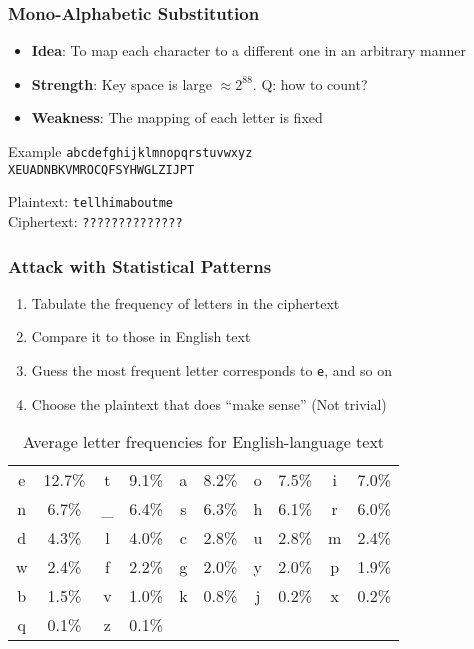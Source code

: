 \begin{frame}[fragile]\frametitle{Mono-Alphabetic Substitution}
\begin{itemize}
\item \textbf{Idea}: To map each character to a different one in an arbitrary manner
\item \textbf{Strength}: Key space is large $\approx 2^{88}$. \alert{Q: how to count?}
\item \textbf{Weakness}: The mapping of each letter is fixed
\end{itemize}
\begin{exampleblock}{Example}
\verb|abcdefghijklmnopqrstuvwxyz|\\
\verb|XEUADNBKVMROCQFSYHWGLZIJPT|

Plaintext: \verb|tellhimaboutme|\\
Ciphertext: \verb|??????????????|
\end{exampleblock}
\end{frame}
\begin{frame}[fragile]\frametitle{Attack with Statistical Patterns}
\begin{enumerate}
\item Tabulate the frequency of letters in the ciphertext
\item Compare it to those in English text
\item Guess the most frequent letter corresponds to \verb|e|, and so on
\item Choose the plaintext that does ``make sense'' (Not trivial)
\end{enumerate}
\begin{table}
\begin{center}
\caption{Average letter frequencies for English-language text}
\begin{tabular}{|cc|cc|cc|cc|cc|} \hline
e & 12.7\% & t & 9.1\% & a & 8.2\% & o & 7.5\% & i & 7.0\%\\
n & 6.7\% & \_ & 6.4\% & s & 6.3\% & h & 6.1\% & r & 6.0\%\\
d & 4.3\% & l & 4.0\% & c & 2.8\% & u & 2.8\% & m & 2.4\%\\
w & 2.4\% & f & 2.2\% & g & 2.0\% & y & 2.0\% & p & 1.9\%\\
b & 1.5\% & v & 1.0\% & k & 0.8\% & j & 0.2\% & x & 0.2\%\\
q & 0.1\% & z & 0.1\% & & & & & &\\ \hline
\end{tabular}
\end{center}
\end{table}
\end{frame}
